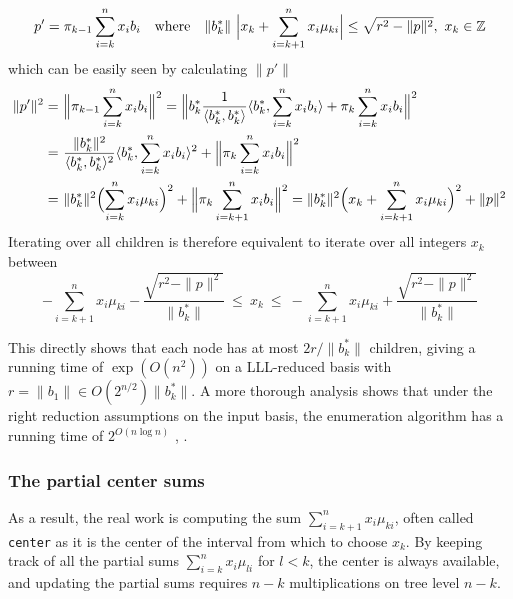 \documentclass{scrartcl}
\newcommand{\Z}{\mathbb{Z}}
\begin{document}
    \begin{equation*}
        p' = \pi_{k - 1}\sum_{i = k}^n x_i b_i \quad \text{where} \quad \|b_k^*\| \ \Bigl|x_k + \sum_{i = k + 1}^n x_i \mu_{ki} \Bigr| \leq \sqrt{r^2 - \|p\|^2}, \ x_k \in \Z
    \end{equation*}
    which can be easily seen by calculating $\|p'\|$
    \begin{align*}
        \|p'\|^2 =\ &\Bigl\| \pi_{k - 1}\sum_{i = k}^n x_i b_i \Bigr\|^2 = \Bigl\| b^*_k \frac 1 {\langle b^*_k, b^*_k \rangle} \langle b^*_k, \sum_{i = k}^n x_i b_i \rangle + \pi_k \sum_{i = k}^n x_i b_i \Bigr\|^2 \\
        =\ &\frac {\| b_k^* \|^2} {\langle b^*_k, b^*_k \rangle^2} \langle b_k^*, \sum_{i = k}^n x_i b_i \rangle^2 + \Bigl\| \pi_k \sum_{i = k}^n x_i b_i \Bigr\|^2 \\
        =\ &\| b^*_k \| ^2 \Bigl( \sum_{i = k}^n x_i\mu_{ki} \Bigr)^2 + \Bigl\| \pi_k \sum_{i = k + 1}^n x_i b_i \Bigr\|^2 = \|b_k^*\|^2 \Bigl( x_k + \sum_{i = k + 1}^n x_i \mu_{ki} \Bigr)^2 + \| p \|^2
    \end{align*}
    Iterating over all children is therefore equivalent to iterate over all integers $x_k$ between
    \begin{equation*}
        -\sum_{i = k + 1}^n x_i \mu_{ki} - \frac {\sqrt{r^2 - \|p\|^2}} {\| b_k^* \|} \ \leq \  x_k \ \leq \ -\sum_{i = k + 1}^n x_i \mu_{ki} + \frac {\sqrt{r^2 - \|p\|^2}} {\| b_k^* \|}
    \end{equation*}

    This directly shows that each node has at most $2r/\| b_k^* \|$ children, giving a running time of $\exp({O(n^2)})$ on a LLL-reduced basis with $r = \| b_1 \| \in O(2^{n/2}) \| b_k^* \|$. 
    A more thorough analysis shows that under the right reduction assumptions on the input basis, the enumeration algorithm has a running time of $2^{O(n\log n)}$ \cite{enum1}, \cite{enum_complexity}.

    \subsubsection{The partial center sums}

    \label{sec:center_partsums}
    As a result, the real work is computing the sum $\sum_{i = k + 1}^n x_i \mu_{ki}$, often called \texttt{center} as it is the center of the interval from which to choose $x_k$. By keeping track of all the partial sums $\sum_{i=k}^n x_i \mu_{li}$ for $l < k$, the center is always available, and updating the partial sums requires $n - k$ multiplications on tree level $n - k$.
\end{document}
